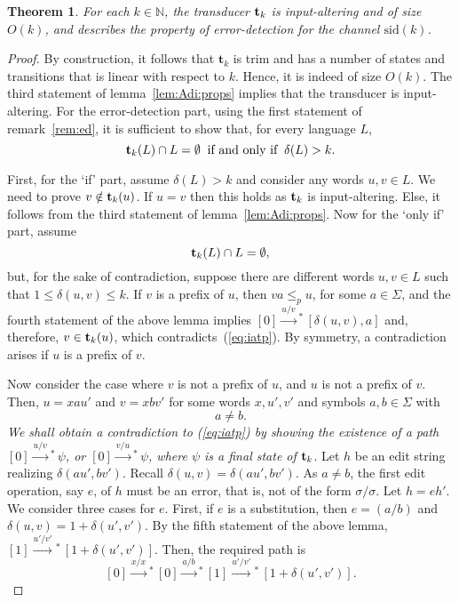 \documentclass{article}
\theoremstyle{plain}
\newtheorem{theorem}{Theorem}[]
\theoremstyle{definition}
\theoremstyle{remark}
\newcommand{\N}{\mathbb{N}}
\newcommand{\xras}[1]{\xrightarrow{#1}\!\!{}^*\,}
\newcommand{\e}{\lambda}
\newcommand\tsid{\trt_{k}}
\newcommand\dsid{\ensuremath{\delta}\xspace}
\newcommand\al{\Sigma}        \newcommand\alG{\Gamma}        \newcommand\eew{(\e/\e)}        \newcommand\ealph{E_\al}   \newcommand\aut{\mathbf{a}}   \newcommand\autb{\mathbf{b}}   \newcommand\tr{\mathbf{t}}    \newcommand\sz[1]{|#1|}       \newcommand\weight[1]{\mathrm{weight}(#1)}       \newcommand\ch{\gamma}        \newcommand\chid{\mathrm{id}} \newcommand\chsid{\mathrm{sid}} \newcommand\dist{\dsid}               \newcommand\inp{\mathrm{inp}}
\begin{document}
\begin{theorem}\label{th:iat:ed}
For each $k\in\N$, the transducer $\tsid$ is input-altering and of size $O(k)$, and
describes the property of error-detection for the channel $\chsid(k)$.
\end{theorem}
\begin{proof}
By construction, it follows that $\tr_k$ is trim and has a number of states and transitions that is linear with respect to $k$. Hence, it is indeed of size $O(k)$.
The third statement of lemma~\ref{lem:Adi:props} implies that the transducer is input-altering.
For the error-detection part, using the first statement of remark~\ref{rem:ed}, it is sufficient  to show that, for every language $L$,
\[
\tsid(L)\cap L=\emptyset \>\hbox{ if and only if }\> \dsid(L)>k.
\]

First, for the `if' part, assume $\dsid(L)>k$ and consider any words $u,v\in L$.  We need to
prove $v\notin\tsid(u)$.
If $u=v$ then this holds as $\tsid$ is input-altering. Else, it follows from the third statement of
lemma~\ref{lem:Adi:props}.  Now for the `only if' part, assume
\begin{equation}\label{eq:iatp}
\tsid(L)\cap L=\emptyset,
\end{equation}
but, for the sake of contradiction,  suppose there are different words $u,v\in L$ such that $1\le\dsid(u,v)\le k$. If $v$ is a prefix of $u$, then
$va\le_p u$, for some $a\in\al$, and
the fourth statement of the above lemma implies
$[0]\xras{u\slash v} [\dsid(u,v),a]$ and, therefore, $v\in\tsid(u)$, which contradicts~(\ref{eq:iatp}).
By symmetry, a contradiction arises if $u$ is a prefix of $v$.

Now consider the case where $v$ is not a prefix of  $u$, and $u$ is not a prefix of $v$. Then, $u=xau'$ and $v=xbv'$ for some words $x,u',v'$ and   symbols $a,b\in\al$ with $$a\not=b.$$
\emph{We shall obtain a contradiction
to (\ref{eq:iatp}) by showing the existence of a path $[0]\xras{u\slash v}\psi$, or $[0]\xras{v\slash u}\psi$, where $\psi$ is a final state of $\tsid$}.
Let $h$ be an edit string realizing
$\dsid(au',bv')$. Recall $\dsid(u,v)=\dsid(au',bv')$. As $a\not=b$, the first edit operation, say  $e$, of $h$ must
be an error, that is, not of the form $\sigma/\sigma$. Let $h=eh'$. We consider three cases for $e$.
First, if $e$ is a substitution, then $e=(a/b)$  and $\dsid(u,v)=1+\dsid(u',v')$. By the fifth statement of the above lemma, $[1]\xras{u'\slash v'} [1+\dsid(u',v')]$. Then, the required path is
\[
[0]\xras{x/x}[0]\xras{a/b}[1]\xras{u'\slash v'} [1+\dsid(u',v')].
\]


\end{proof}
\end{document}

